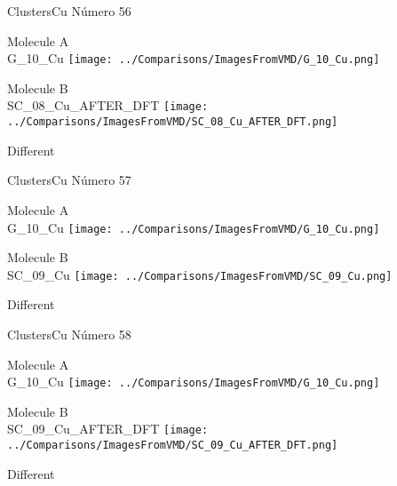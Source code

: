  \newpage

\vtab[-3cm]
\begin{center}
{\large ClustersCu \tab Número 56}
\end{center}
\begin{multicols}{2}
\begin{center}
Molecule A \\ 
G\_10\_Cu
\texttt{[image: ../Comparisons/ImagesFromVMD/G\_10\_Cu.png]}
\\
\vtab

\columnbreak
Molecule B \\ 
SC\_08\_Cu\_AFTER\_DFT
\texttt{[image: ../Comparisons/ImagesFromVMD/SC\_08\_Cu\_AFTER\_DFT.png]}
\\
\vtab


\end{center}
\end{multicols}
\begin{center}
\textcolor{NavyBlue}{\Large Different}
\end{center}

 \newpage

\vtab[-3cm]
\begin{center}
{\large ClustersCu \tab Número 57}
\end{center}
\begin{multicols}{2}
\begin{center}
Molecule A \\ 
G\_10\_Cu
\texttt{[image: ../Comparisons/ImagesFromVMD/G\_10\_Cu.png]}
\\
\vtab

\columnbreak
Molecule B \\ 
SC\_09\_Cu
\texttt{[image: ../Comparisons/ImagesFromVMD/SC\_09\_Cu.png]}
\\
\vtab


\end{center}
\end{multicols}
\begin{center}
\textcolor{NavyBlue}{\Large Different}
\end{center}

 \newpage

\vtab[-3cm]
\begin{center}
{\large ClustersCu \tab Número 58}
\end{center}
\begin{multicols}{2}
\begin{center}
Molecule A \\ 
G\_10\_Cu
\texttt{[image: ../Comparisons/ImagesFromVMD/G\_10\_Cu.png]}
\\
\vtab

\columnbreak
Molecule B \\ 
SC\_09\_Cu\_AFTER\_DFT
\texttt{[image: ../Comparisons/ImagesFromVMD/SC\_09\_Cu\_AFTER\_DFT.png]}
\\
\vtab


\end{center}
\end{multicols}
\begin{center}
\textcolor{NavyBlue}{\Large Different}
\end{center}

